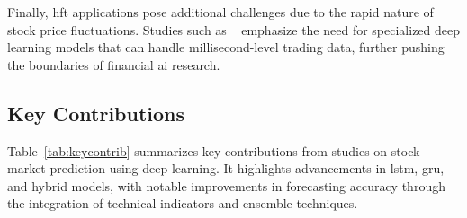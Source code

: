 Finally, \acrfull{hft} applications pose additional challenges due to the rapid nature
of stock price fluctuations. Studies such as \citeauthor{guo2024LSTMStock}~\parencite{guo2024LSTMStock}
emphasize the need for specialized deep learning models that can handle millisecond-level trading 
data, further pushing the boundaries of financial \acrfull{ai} research.

\subsection{Key Contributions}

Table~\ref{tab:keycontrib} summarizes key contributions from studies on stock market prediction using deep learning. It highlights advancements in \acrshort{lstm}, \acrshort{gru}, and hybrid models, with notable improvements in forecasting accuracy through the integration of technical indicators and ensemble techniques.

